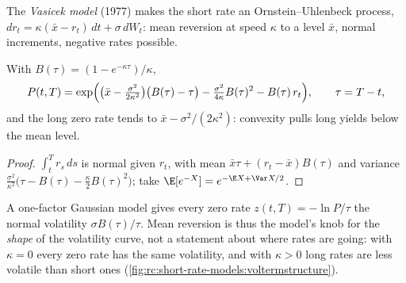 \begin{definition}\label{def:rc:short-rate-models:vasicek}
The \emph{Vasicek model} (1977) makes the short rate an
Ornstein--Uhlenbeck process, $dr_t = \kappa(\bar x-r_t)\,dt+\sigma\,dW_t$: mean
reversion at speed $\kappa$ to a level $\bar x$, normal increments, negative rates
possible.
\end{definition}

\begin{proposition}\label{prop:rc:short-rate-models:vasicek}
With $B(\tau) = (1-e^{-\kappa\tau})/\kappa$,
\[
P(t,T) = \exp\Bigl(\bigl(\bar x-\tfrac{\sigma^2}{2\kappa^2}\bigr)\bigl(B(\tau)-\tau\bigr)
-\tfrac{\sigma^2}{4\kappa}B(\tau)^2 - B(\tau)\,r_t\Bigr),\qquad \tau = T-t,
\]
and the long zero rate tends to $\bar x-\sigma^2/(2\kappa^2)$: convexity pulls long
yields below the mean level.
\end{proposition}
\begin{proof}
$\int_t^Tr_s\,ds$ is normal given $r_t$, with mean $\bar x\tau+(r_t-\bar
x)B(\tau)$ and variance $\frac{\sigma^2}{\kappa^2}\bigl(\tau-B(\tau)-\frac\kappa2
B(\tau)^2\bigr)$; take $\E[e^{-X}] = e^{-\E X+\Var X/2}$.
\end{proof}

A one-factor Gaussian model gives every zero rate $z(t,T) = -\ln P/\tau$ the
normal volatility $\sigma B(\tau)/\tau$. Mean reversion is thus the model's knob
for the \emph{shape} of the volatility curve, not a statement about where rates
are going: with $\kappa=0$ every zero rate has the same volatility, and with
$\kappa>0$ long rates are less volatile than short ones
(\cref{fig:rc:short-rate-models:voltermstructure}).

\begin{omfigure}

\label{fig:rc:short-rate-models:voltermstructure}
\end{omfigure}

